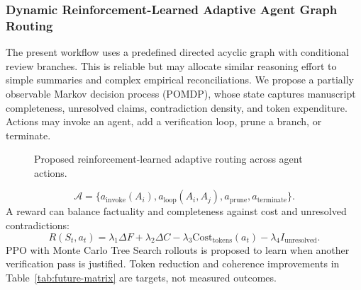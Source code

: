 \documentclass[conference]{IEEEtran}
\begin{document}
\subsubsection{Dynamic Reinforcement-Learned Adaptive Agent Graph Routing}
The present workflow uses a predefined directed acyclic graph with conditional review branches. This is reliable but may allocate similar reasoning effort to simple summaries and complex empirical reconciliations. We propose a partially observable Markov decision process (POMDP), whose state captures manuscript completeness, unresolved claims, contradiction density, and token expenditure. Actions may invoke an agent, add a verification loop, prune a branch, or terminate.
\begin{figure}[t]\centering
{}
\caption{Proposed reinforcement-learned adaptive routing across agent actions.}\label{fig:adaptive-routing}\end{figure}
\begin{equation}\mathcal{A}=\{a_{\mathrm{invoke}}(A_i),a_{\mathrm{loop}}(A_i,A_j),a_{\mathrm{prune}},a_{\mathrm{terminate}}\}.\end{equation}
A reward can balance factuality and completeness against cost and unresolved contradictions:
\begin{equation}R(S_t,a_t)=\lambda_1\Delta F+\lambda_2\Delta C-\lambda_3\mathrm{Cost}_{\mathrm{tokens}}(a_t)-\lambda_4 I_{\mathrm{unresolved}}.\end{equation}
PPO with Monte Carlo Tree Search rollouts is proposed to learn when another verification pass is justified. Token reduction and coherence improvements in Table~\ref{tab:future-matrix} are targets, not measured outcomes.
\end{document}
